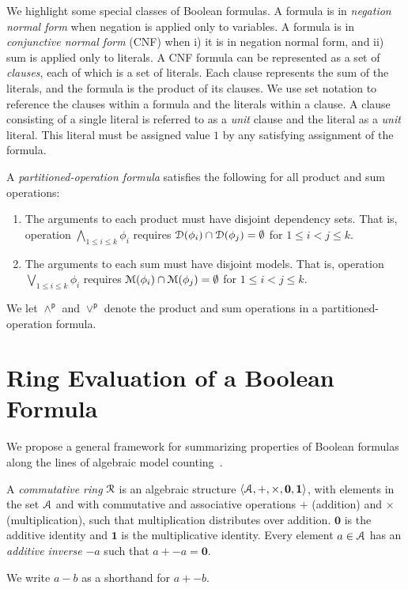 \documentclass[letterpaper,USenglish,cleveref, autoref, thm-restate]{lipics-v2021}
\newcommand{\pand}{\mathbin{\land^\textsf{p}}}
\newcommand{\por}{\mathbin{\lor^\textsf{p}}}
\newcommand{\dependencyset}{{\cal D}}
\newcommand{\ring}{{\cal R}}
\newcommand{\dset}{{\cal A}}
\newcommand{\radd}{+}
\newcommand{\rmul}{\times}
\newcommand{\addident}{\textbf{0}}
\newcommand{\mulident}{\textbf{1}}
\newcommand{\modelset}{{\cal M}}
\begin{document}
  We highlight some special classes of Boolean formulas.  A formula is
  in \emph{negation normal form} when negation is applied only to variables.  A
  formula is in \emph{conjunctive normal form} (CNF) when i) it is in
  negation normal form, and ii) sum is applied only to literals.  A CNF
  formula can be represented as a set of \emph{clauses}, each of which is a
  set of literals.  Each clause represents the sum of the
  literals, and the formula is the product of its clauses.  We use
  set notation to reference the clauses within a formula and the
  literals within a clause.  A clause consisting of a single literal is referred to as a \emph{unit} clause and the literal as a \emph{unit} literal.
This literal must be assigned value $1$ by any satisfying assignment of the formula.

\begin{definition}\label{def:partitioned-operation-formula}
  A \emph{partitioned-operation formula}
 satisfies the following for all product and sum operations:
      \begin{enumerate}
      \item The arguments to each product must have disjoint dependency sets.  That is, operation
        $\bigwedge_{1 \leq i \leq k} \phi_i$ requires $\dependencyset(\phi_i) \cap \dependencyset(\phi_j) = \emptyset$ for $1 \leq i < j \leq k$.
      \item The arguments to each sum must have disjoint models.  That is, operation
        $\bigvee_{1 \leq i \leq k} \phi_i$ requires $\modelset(\phi_i) \cap \modelset(\phi_j) = \emptyset$ for $1 \leq i < j \leq k$.
      \end{enumerate}
\end{definition}
     We let $\pand$ and $\por$ denote the product and sum operations in a partitioned-operation formula.

  \section{Ring Evaluation of a Boolean Formula}

We propose a general framework for summarizing properties of Boolean
formulas along the lines of algebraic model counting~\cite{kimmig:jal:2017}.

\begin{definition}
  A \emph{commutative ring} $\ring$ is an algebraic structure
  $\langle \dset, \radd, \rmul, \addident, \mulident \rangle$,
  with elements in the set $\dset$ and with commutative and
  associative operations $\radd$ (addition) and $\rmul$ (multiplication),
  such that multiplication distributes
  over addition.  $\addident$ is the additive identity and $\mulident$ is
  the multiplicative identity.  Every element $a \in \dset$ has an
  \emph{additive inverse} $-a$ such that $a + -a = \addident$.
\label{def:ring}
\end{definition}
We write $a - b$ as a shorthand for $a + -b$.
\end{document}
